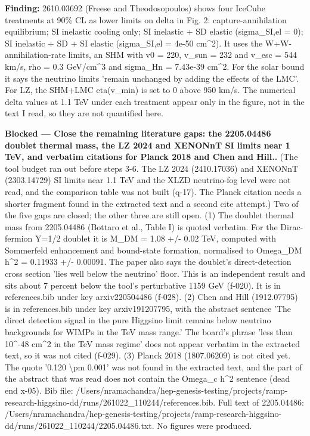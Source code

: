 \documentclass[11pt,a4paper]{article}
\begin{document}
\textbf{Finding:} 2610.03692 (Freese and Theodosopoulos) shows four IceCube treatments at 90\% CL as lower limits on delta in Fig. 2: capture-annihilation equilibrium; SI inelastic cooling only; SI inelastic + SD elastic (sigma\_SI,el = 0); SI inelastic + SD + SI elastic (sigma\_SI,el = 4e-50 cm\textasciicircum{}2). It uses the W+W- annihilation-rate limits, an SHM with v0 = 220, v\_sun = 232 and v\_esc = 544 km/s, rho = 0.3 GeV/cm\textasciicircum{}3 and sigma\_Hn = 7.43e-39 cm\textasciicircum{}2. For the solar bound it says the neutrino limits 'remain unchanged by adding the effects of the LMC'. For LZ, the SHM+LMC eta(v\_min) is set to 0 above 950 km/s. The numerical delta values at 1.1 TeV under each treatment appear only in the figure, not in the text I read, so they are not quantified here.

\textbf{Blocked --- Close the remaining literature gaps: the 2205.04486 doublet thermal mass, the LZ 2024 and XENONnT SI limits near 1 TeV, and verbatim citations for Planck 2018 and Chen and Hill..} (The tool budget ran out before steps 3-6. The LZ 2024 (2410.17036) and XENONnT (2303.14729) SI limits near 1.1 TeV and the XLZD neutrino-fog level were not read, and the comparison table was not built (q-17). The Planck citation needs a shorter fragment found in the extracted text and a second cite attempt.) Two of the five gaps are closed; the other three are still open. (1) The doublet thermal mass from 2205.04486 (Bottaro et al., Table I) is quoted verbatim. For the Dirac-fermion Y=1/2 doublet it is M\_DM = 1.08 +/- 0.02 TeV, computed with Sommerfeld enhancement and bound-state formation, normalised to Omega\_DM h\textasciicircum{}2 = 0.11933 +/- 0.00091. The paper also says the doublet's direct-detection cross section 'lies well below the neutrino' floor. This is an independent result and sits about 7 percent below the tool's perturbative 1159 GeV (f-020). It is in references.bib under key arxiv220504486 (f-028). (2) Chen and Hill (1912.07795) is in references.bib under key arxiv191207795, with the abstract sentence 'The direct detection signal in the pure Higgsino limit remains below neutrino backgrounds for WIMPs in the TeV mass range.' The board's phrase 'less than 10\textasciicircum{}-48 cm\textasciicircum{}2 in the TeV mass regime' does not appear verbatim in the extracted text, so it was not cited (f-029). (3) Planck 2018 (1807.06209) is not cited yet. The quote '0.120 \textbackslash{}pm 0.001' was not found in the extracted text, and the part of the abstract that was read does not contain the Omega\_c h\textasciicircum{}2 sentence (dead end x-05). Bib file: /Users/nramachandra/hep-genesis-testing/projects/ramp-research-higgsino-dd/runs/261022\_110244/references.bib. Full text of 2205.04486: /Users/nramachandra/hep-genesis-testing/projects/ramp-research-higgsino-dd/runs/261022\_110244/2205.04486.txt. No figures were produced.
\end{document}
